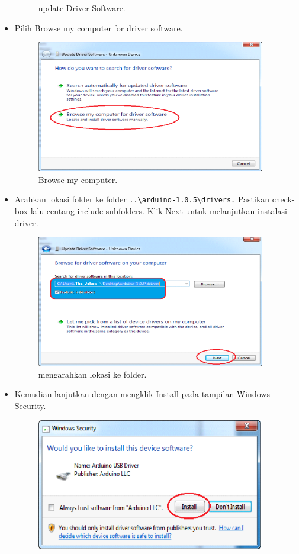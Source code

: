 \begin{itemize}
\begin{figure}[ht]
				\centering
				\caption{update Driver Software.}
			\end{figure}
		\item Pilih Browse my computer for driver software.
			\begin{figure}[ht]
				\includegraphics[width=10cm]{figures/5/1174083/Teori/7.png}
				\centering
				\caption{Browse my computer.}
			\end{figure}
		\item Arahkan lokasi folder ke folder \verb|..\arduino-1.0.5\drivers.| Pastikan check-box lalu centang include subfolders. Klik Next untuk melanjutkan instalasi driver.
			\begin{figure}[ht]
				\includegraphics[width=10cm]{figures/5/1174083/Teori/8.png}
				\centering
				\caption{mengarahkan lokasi ke folder.}
			\end{figure}
		\item Kemudian lanjutkan dengan mengklik Install pada tampilan Windows Security.
			\begin{figure}[ht]
				\includegraphics[width=10cm]{figures/5/1174083/Teori/9.png}

\end{figure}
\end{itemize}
